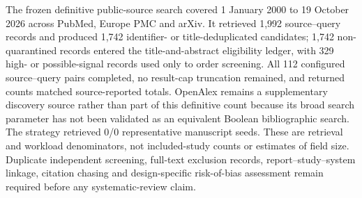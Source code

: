 The frozen definitive public-source search covered 1 January 2000 to 19 October 2026 across PubMed, Europe PMC and arXiv. It retrieved 1,992 source--query records and produced 1,742 identifier- or title-deduplicated candidates; 1,742 non-quarantined records entered the title-and-abstract eligibility ledger, with 329 high- or possible-signal records used only to order screening. All 112 configured source--query pairs completed, no result-cap truncation remained, and returned counts matched source-reported totals. OpenAlex remains a supplementary discovery source rather than part of this definitive count because its broad search parameter has not been validated as an equivalent Boolean bibliographic search. The strategy retrieved 0/0 representative manuscript seeds. These are retrieval and workload denominators, not included-study counts or estimates of field size. Duplicate independent screening, full-text exclusion records, report--study--system linkage, citation chasing and design-specific risk-of-bias assessment remain required before any systematic-review claim.
